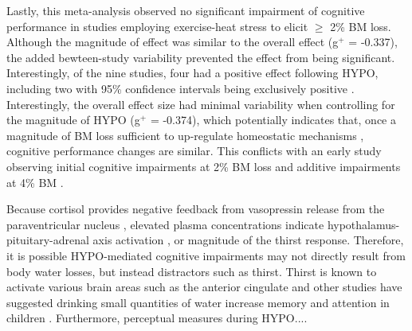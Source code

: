 Lastly, this meta-analysis observed no significant impairment of cognitive performance in studies employing exercise-heat stress to elicit ${\ge}$ 2\% BM loss. Although the magnitude of effect was similar to the overall effect (g${^+}$ = -0.337), the added bewteen-study variability prevented the effect from being significant. Interestingly, of the nine studies, four had a positive effect following HYPO, including two with 95\% confidence intervals being exclusively positive \cite{danci_voluntary_2009,bijlani_effect_1980}. Interestingly, the overall effect size had minimal variability when controlling for the magnitude of HYPO (g${^+}$ = -0.374), which potentially indicates that, once a magnitude of BM loss sufficient to up-regulate homeostatic mechanisms  \cite{sawka_american_2007,cheuvront_dehydration:_2014}, cognitive performance changes are similar. This conflicts with an early study observing initial cognitive impairments at 2\% BM loss and additive impairments at 4\% BM \cite{gopinathan_role_1988}.  

Because cortisol provides negative feedback from vasopressin release from the paraventricular nucleus \cite{andreoli_endocrine_2010}, elevated plasma concentrations indicate hypothalamus-pituitary-adrenal axis activation \cite{lieberman_severe_2005}, or magnitude of the thirst response. Therefore, it is possible HYPO-mediated cognitive impairments may not directly result from body water losses, but instead distractors such as thirst. Thirst is known to activate various brain areas such as the anterior cingulate \cite{saker_regional_2014} and other studies have suggested drinking small quantities of water increase memory and attention in children \cite{benton_effect_2009}. Furthermore, perceptual measures during HYPO....


 
